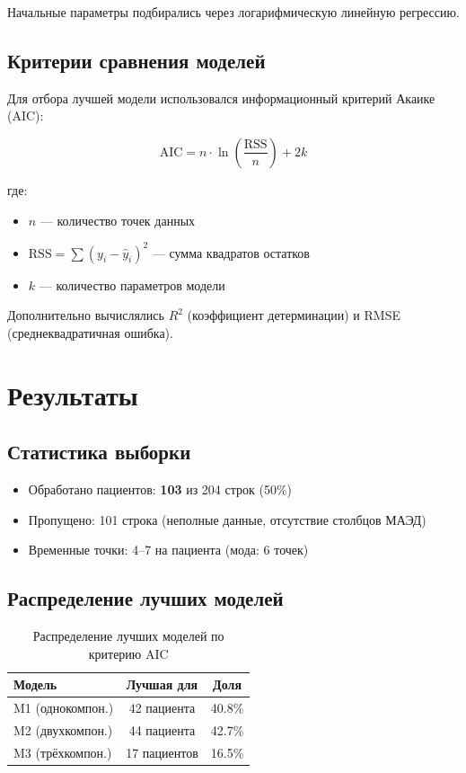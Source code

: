 \documentclass[12pt,a4paper]{article}
\begin{document}
Начальные параметры подбирались через логарифмическую линейную регрессию.

\subsection{Критерии сравнения моделей}

Для отбора лучшей модели использовался информационный критерий Акаике (AIC):

\begin{equation}
\text{AIC} = n \cdot \ln\left(\frac{\text{RSS}}{n}\right) + 2k
\end{equation}

где:
\begin{itemize}
    \item $n$ — количество точек данных
    \item $\text{RSS} = \sum (y_i - \hat{y}_i)^2$ — сумма квадратов остатков
    \item $k$ — количество параметров модели
\end{itemize}

Дополнительно вычислялись $R^2$ (коэффициент детерминации) и RMSE (среднеквадратичная ошибка).

\section{Результаты}

\subsection{Статистика выборки}

\begin{itemize}
    \item Обработано пациентов: \textbf{103} из 204 строк (50\%)
    \item Пропущено: 101 строка (неполные данные, отсутствие столбцов МАЭД)
    \item Временные точки: 4--7 на пациента (мода: 6 точек)
\end{itemize}

\subsection{Распределение лучших моделей}

\begin{table}[H]
\centering
\begin{tabular}{lcc}
\toprule
\textbf{Модель} & \textbf{Лучшая для} & \textbf{Доля} \\
\midrule
M1 (однокомпон.) & 42 пациента & 40.8\% \\
M2 (двухкомпон.) & 44 пациента & 42.7\% \\
M3 (трёхкомпон.) & 17 пациентов & 16.5\% \\
\bottomrule
\end{tabular}
\caption{Распределение лучших моделей по критерию AIC}
\end{table}
\end{document}
